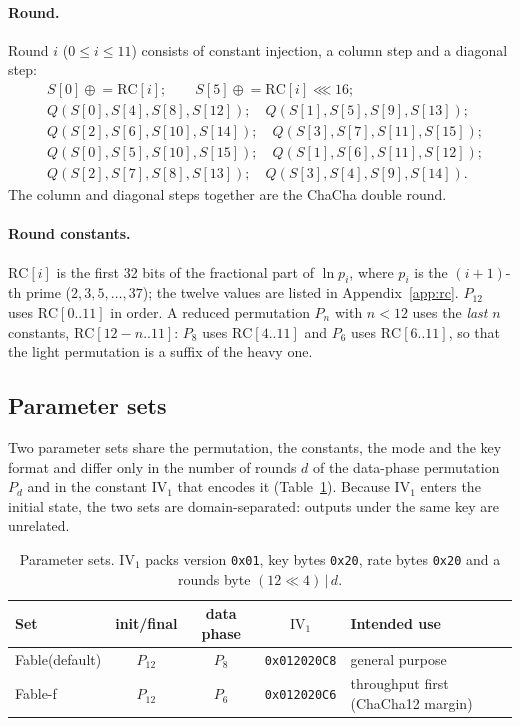 \documentclass{iacrtrans}
\newcommand{\Fable}{\textsf{Fable}\xspace}
\newcommand{\FableF}{\textsf{Fable-f}\xspace}
\newcommand{\ChaCha}{\textsf{ChaCha}\xspace}
\newcommand{\PP}[1]{P_{#1}}
\newcommand{\rotl}{\lll}
\begin{document}
\paragraph{Round.} Round $i$ ($0 \le i \le 11$) consists of constant injection, a column step and a diagonal step:
\begin{align*}
&S[0] \mathrel{\oplus}= \mathrm{RC}[i];\qquad S[5] \mathrel{\oplus}= \mathrm{RC}[i] \rotl 16;\\
&Q(S[0],S[4],S[8],S[12]);\quad Q(S[1],S[5],S[9],S[13]);\\
&Q(S[2],S[6],S[10],S[14]);\quad Q(S[3],S[7],S[11],S[15]);\\
&Q(S[0],S[5],S[10],S[15]);\quad Q(S[1],S[6],S[11],S[12]);\\
&Q(S[2],S[7],S[8],S[13]);\quad Q(S[3],S[4],S[9],S[14]).
\end{align*}
The column and diagonal steps together are the \ChaCha double round.

\paragraph{Round constants.} $\mathrm{RC}[i]$ is the first 32 bits of the fractional part of $\ln p_i$, where $p_i$ is the $(i{+}1)$-th prime ($2, 3, 5, \ldots, 37$); the twelve values are listed in Appendix~\ref{app:rc}. $\PP{12}$ uses $\mathrm{RC}[0..11]$ in order. A reduced permutation $\PP{n}$ with $n<12$ uses the \emph{last} $n$ constants, $\mathrm{RC}[12-n..11]$: $\PP{8}$ uses $\mathrm{RC}[4..11]$ and $\PP{6}$ uses $\mathrm{RC}[6..11]$, so that the light permutation is a suffix of the heavy one.

\subsection{Parameter sets}
\label{sec:params}
Two parameter sets share the permutation, the constants, the mode and the key format and differ only in the number of rounds $d$ of the data-phase permutation $\PP{d}$ and in the constant $\mathrm{IV}_1$ that encodes it (Table~\ref{tab:params}). Because $\mathrm{IV}_1$ enters the initial state, the two sets are domain-separated: outputs under the same key are unrelated.

\begin{table}[htb]
\centering
\caption{Parameter sets. $\mathrm{IV}_1$ packs version \texttt{0x01}, key bytes \texttt{0x20}, rate bytes \texttt{0x20} and a rounds byte $(12 \ll 4)\,|\,d$.}
\label{tab:params}
\small
\begin{tabular}{lcccl}
\toprule
Set & init/final & data phase & $\mathrm{IV}_1$ & Intended use\\
\midrule
\Fable (default) & $\PP{12}$ & $\PP{8}$ & \texttt{0x012020C8} & general purpose\\
\FableF & $\PP{12}$ & $\PP{6}$ & \texttt{0x012020C6} & throughput first (ChaCha12 margin)\\
\bottomrule
\end{tabular}
\end{table}
\end{document}
